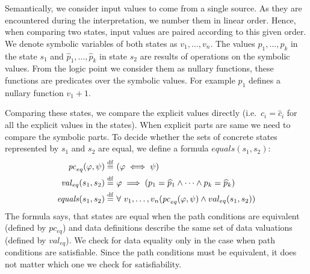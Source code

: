 Semantically, we consider input values to come from a single source. As they are
encountered during the interpretation, we number them in linear order. Hence,
when comparing two states, input values are paired according to this
given order. We denote symbolic variables of both states as $v_1, \dots, v_n$.
The values $p_1, \dots, p_k$ in the state $s_1$ and $\widehat{p}_1, \dots,
\widehat{p}_k$ in state $s_2$ are results of operations on the symbolic values.
From the logic point we consider them as nullary functions, these functions are
predicates over the symbolic values. For example $p_1$ defines a nullary
function $v_1 + 1$.

Comparing these states, we compare the explicit values directly (i.e.~$c_i =
\widehat{c}_i$ for all the explicit values in the states).  When explicit parts
are same we need to compare the symbolic parts. To decide whether the sets of
concrete states represented by $s_1$ and $s_2$ are equal, we define a formula
$equals(s_1, s_2)$:
\begin{equation*}
\begin{aligned}
    \mathit{pc}_{eq}(\varphi, \psi) \stackrel{\mathrm{df}}{=} & ~(\varphi \iff \psi) \\
    \mathit{val}_{eq}(s_1, s_2) \stackrel{\mathrm{df}}{=} & ~\varphi \implies (p_1 = \widehat{p}_1 \wedge \dots \wedge p_k = \widehat{p}_k ) \\
    \mathit{equals}(s_1, s_2) \stackrel{\mathrm{df}}{=} & ~\forall~v_1,\dots, v_n (\mathit{pc}_{eq}(\varphi, \psi)
    \wedge val_{eq}(s_1, s_2))
\end{aligned}
\end{equation*}
The formula says, that states are equal when the path conditions are
equivalent (defined by $pc_{eq}$) and data definitions describe the same set
of data valuations (defined by $val_{eq}$). We check for data equality only in
the case when path conditions are satisfiable. Since the path conditions must
be equivalent, it does not matter which one we check for satisfiability.

